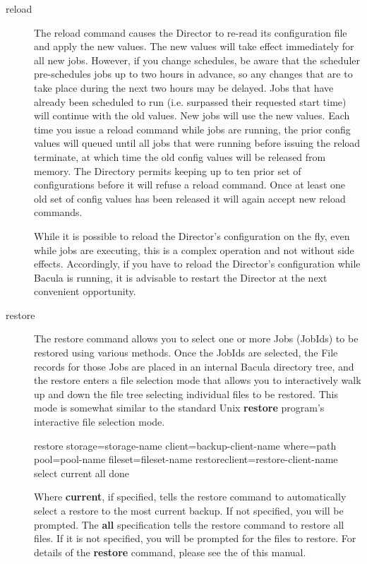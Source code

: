 \begin{description}
\item [reload]
  The reload command causes the Director to re-read its configuration
  file and apply the new values. The new values will take effect     
  immediately for all new jobs.  However, if you change schedules,
  be aware that the scheduler pre-schedules jobs up to two hours in
  advance, so any changes that are to take place during the next two
  hours may be delayed.  Jobs that have already been scheduled to run
  (i.e. surpassed their requested start time) will continue with the
  old values.  New jobs will use the new values. Each time you issue
  a reload command while jobs are running, the prior config values   
  will queued until all jobs that were running before issuing
  the reload terminate, at which time the old config values will
  be released from memory. The Directory permits keeping up to
  ten prior set of configurations before it will refuse a reload
  command. Once at least one old set of config values has been
  released it will again accept new reload commands. 

   While it is possible to reload the Director's configuration on the fly,
   even while jobs are executing, this is a complex operation and not
   without side effects.  Accordingly, if you have to reload the Director's
   configuration while Bacula is running, it is advisable to restart the
   Director at the next convenient opportunity.

\label{restore_command}
\item [restore]
   The restore command allows you to select one or more Jobs (JobIds) to be
   restored using various methods.  Once the JobIds are selected, the File
   records for those Jobs are placed in an internal Bacula directory tree,
   and the restore enters a file selection mode that allows you to
   interactively walk up and down the file tree selecting individual files
   to be restored.  This mode is somewhat similar to the standard Unix {\bf
   restore} program's interactive file selection mode.

restore storage=\lt{}storage-name\gt{} client=\lt{}backup-client-name\gt{} 
  where=\lt{}path\gt{} pool=\lt{}pool-name\gt{} fileset=\lt{}fileset-name\gt{} 
  restoreclient=\lt{}restore-client-name\gt{}
  select current all done  

   Where {\bf current}, if specified, tells the restore command to
   automatically select a restore to the most current backup.  If not
   specified, you will be prompted.  The {\bf all} specification tells the
   restore command to restore all files.  If it is not specified, you will
   be prompted for the files to restore.  For details of the {\bf restore}
   command, please see the  of this
   manual.


\end{description}
